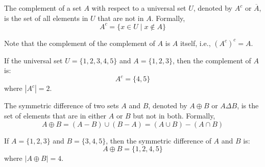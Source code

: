 \begin{definition}[Complement]
    The complement of a set $A$ with respect to a universal set $U$, denoted by $A^c$ or $\overline{A}$, is the set of all elements in $U$ that are not in $A$. Formally,
    \[ A^c = \{x \in U \mid x \notin A\} \]
    \begin{center}
    \end{center}
\end{definition}
Note that the complement of the complement of $A$ is $A$ itself, i.e., $(A^c)^c = A$.
\begin{eg}
    If the universal set $U = \{1, 2, 3, 4, 5\}$ and $A = \{1, 2, 3\}$, then the complement of $A$ is:
    \[ A^c = \{4, 5\} \]
    where $|A^c| = 2$.
\end{eg}

\begin{definition}
    The symmetric difference of two sets $A$ and $B$, denoted by $A \oplus B$ or $A \Delta B$, is the set of elements that are in either $A$ or $B$ but not in both. Formally,
    \[ A \oplus B = (A - B) \cup (B - A) = (A \cup B) - (A \cap B) \]
    \begin{center}
    \end{center}
\end{definition}
\begin{eg}
    If $A = \{1, 2, 3\}$ and $B = \{3, 4, 5\}$, then the symmetric difference of $A$ and $B$ is:
    \[ A \oplus B = \{1, 2, 4, 5\} \]
    where $|A \oplus B| = 4$.
\end{eg}

